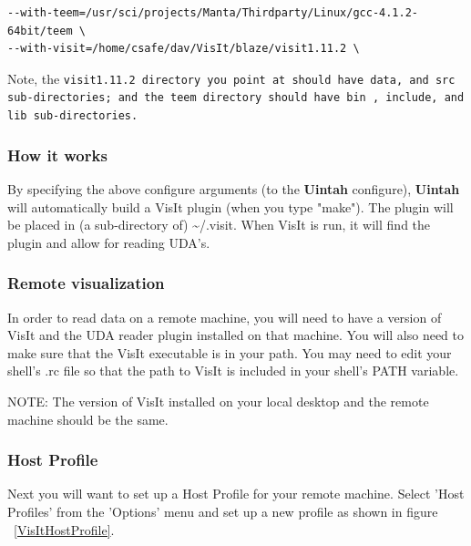 \documentclass[12pt]{article}
\begin{document}
\begin{verbatim}
--with-teem=/usr/sci/projects/Manta/Thirdparty/Linux/gcc-4.1.2-64bit/teem \
--with-visit=/home/csafe/dav/VisIt/blaze/visit1.11.2 \
\end{verbatim}

Note, the \tt visit1.11.2 \normalfont directory you point at should
have \tt data\normalfont , and \tt src \normalfont sub-directories;
and the \tt teem \normalfont directory should have \tt bin\normalfont
, \tt include\normalfont , and \tt lib \normalfont sub-directories.

\subsubsection{How it works}
By specifying the above configure arguments (to the \textbf{Uintah}
configure), \textbf{Uintah} will automatically build a VisIt plugin
(when you type "make"). The plugin will be placed in (a sub-directory
of) \textasciitilde/.visit. When VisIt is run, it will find the plugin
and allow for reading UDA's.

\subsubsection{Remote visualization}
In order to read data on a remote machine, you will need to have a
version of VisIt and the UDA reader plugin installed on that
machine. You will also need to make sure that the VisIt executable is
in your path. You may need to edit your shell's .rc file so that the
path to VisIt is included in your shell's PATH variable.

NOTE: The version of VisIt installed on your local desktop and the
remote machine should be the same.

\subsubsection{Host Profile}
Next you will want to set up a Host Profile for your remote
machine. Select 'Host Profiles' from the 'Options' menu and set up a
new profile as shown in figure ~\ref{VisItHostProfile}.
\end{document}
